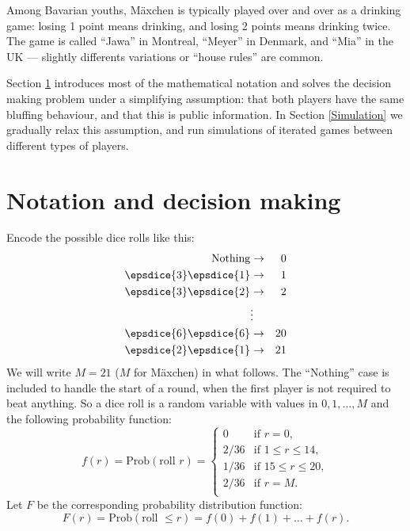 \documentclass[12pt]{article}
\begin{document}
Among Bavarian youths, M\"{a}xchen is typically played over and over as a drinking game: losing 1 point means drinking, and losing 2 points means drinking twice. The game is called ``Jawa'' in Montreal, ``Meyer'' in Denmark, and ``Mia'' in the UK --- slightly differents variations or ``house rules'' are common.

Section \ref{Notation} introduces most of the mathematical notation and solves the decision making problem under a simplifying assumption: that both players have the same bluffing behaviour, and that this is public information. In Section \ref{Simulation} we gradually relax this assumption, and run simulations of iterated games between different types of players.

\section{\large{Notation and decision making}}\label{Notation}
Encode the possible dice rolls like this: 
\begin{eqnarray*}
\textrm{Nothing} & \rightarrow & 0\\
\epsdice{3}\epsdice{1} & \rightarrow & 1\\
\epsdice{3}\epsdice{2} & \rightarrow & 2\\
 & \vdots & \\
\epsdice{6}\epsdice{6} & \rightarrow & 20\\
\epsdice{2}\epsdice{1} & \rightarrow & 21\\
\end{eqnarray*}
We will write $M = 21$ ($M$ for M\"{a}xchen) in what follows. The ``Nothing'' case is included to handle the start of a round, when the first player is not required to beat anything. So a dice roll is a random variable with values in ${0,1,\ldots,M}$ and the following probability function:
$$
f(r) = \textrm{Prob}(\textrm{roll } r) = \left\{\begin{array}{ll} 
0 & \textrm{if } r = 0,\\ 
2/36 & \textrm{if } 1 \leq r \leq 14, \\
1/36 & \textrm{if } 15 \leq r \leq 20,\\
2/36 & \textrm{if } r = M.\\  
\end{array}\right.
$$
 Let $F$ be the corresponding probability distribution function:
$$
F(r) = \textrm{Prob}(\textrm{roll }\leq r) = f(0) + f(1) + \ldots + f(r).
$$
\end{document}
